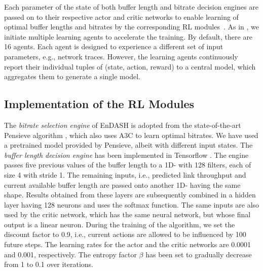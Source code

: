 \indent Each parameter of the state  of both buffer length and bitrate decision engines are passed on to their respective actor and critic networks to enable learning of optimal buffer lengths and bitrates by the corresponding \ac{RL} modules~\cite{mao2017neural}.
As in \cite{mao2017neural}, we initiate multiple learning agents to accelerate the training. By default, there are 16 agents. Each agent is designed to experience a different set of input parameters, e.g., network traces. However, the learning agents continuously report  their individual tuples of (state, action, reward)  to a central model, which aggregates them to generate a single model.
\subsection{Implementation of the \acs{RL} Modules}
The \textit{bitrate selection engine} of EnDASH is adopted from the state-of-the-art Pensieve algorithm \cite{mao2017neural}, which also uses \ac{A3C} to learn optimal bitrates. We have used a pretrained model provided by Pensieve, albeit with different input states.  The \textit{buffer length decision engine} has been implemented in Tensorflow \cite{Abadi2016}. The engine passes five previous values of the buffer length to a 1D- with 128 filters, each of size 4 with stride 1. The remaining inputs, i.e., predicted link throughput and current available buffer length are passed onto another 1D- having the same shape. Results obtained from these layers are subsequently combined in a hidden layer having 128 neurons and uses the softmax function. The same inputs are also used by the critic network, which has the same neural network, but whose final output is a linear neuron. During the training of the algorithm, we set the discount factor to 0.9, i.e., current actions are allowed to be influenced by 100 future steps. The learning rates for the actor and the critic networks are 0.0001 and 0.001, respectively. The entropy factor $\beta$ has been set to gradually decrease from 1 to 0.1 over iterations.
